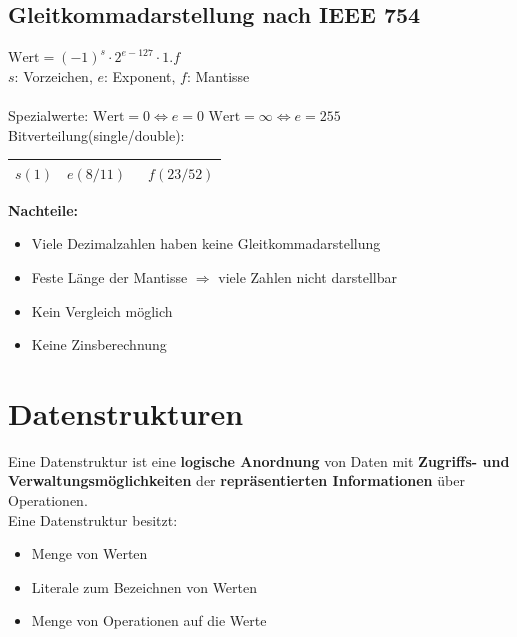 \documentclass[fs, footer]{latex4ei}
\begin{document}
\begin{multicols*}{4}
	\subsection{Gleitkommadarstellung nach IEEE 754}
	$\text{Wert} = (-1)^s \cdot 2^{e-127} \cdot 1.f$\\
	$s$: Vorzeichen, $e$: Exponent, $f$: Mantisse\\ 
	\\[0.5em]
	Spezialwerte: $\text{Wert} = 0 \Leftrightarrow e=0$ \qquad $\text{Wert} = \infty \Leftrightarrow e=255$ \\
	Bitverteilung(single/double):\\
	\begin{tabular}{|c|c|c|} \hline 
		$s(1)$ & \quad $e(8/11)$ \quad\qquad & \qquad\qquad\qquad\ $f(23/52)$ \qquad\qquad\qquad\qquad \\ \hline
	\end{tabular}
	\textbf{Nachteile:}\\
	\begin{itemize}
		\item Viele Dezimalzahlen haben keine Gleitkommadarstellung
		\item Feste Länge der Mantisse $\Rightarrow$ viele Zahlen nicht darstellbar
		\item Kein Vergleich möglich
		\item Keine Zinsberechnung
	\end{itemize}
\fi

\section{Datenstrukturen}
Eine Datenstruktur ist eine \textbf{logische Anordnung} von Daten
mit \textbf{Zugriffs- und Verwaltungsmöglichkeiten} der \textbf{repräsentierten Informationen} über Operationen.\\
Eine Datenstruktur besitzt:\\
\begin{itemize}\itemsep0pt
	\item Menge von Werten
	\item Literale zum Bezeichnen von Werten
	\item Menge von Operationen auf die Werte
\end{itemize}


\end{multicols*}
\end{document}
